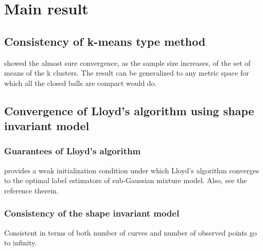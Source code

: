 

\section{Main result}




	\subsection{Consistency of k-means type method}
		\citet{Pollard1981a} showed the almost sure convergence, as the sample size increases, of the set of means of the k clusters. The result can be generalized to any metric space for which all the closed balls are compact would do.

	\subsection{Convergence of Lloyd's algorithm using shape invariant model}
		\subsubsection*{Guarantees of Lloyd's algorithm}
			\citet{Lu} provides a weak initialization condition under which Lloyd's algorithm converges to the optimal label estimators of sub-Gaussian mixture model.
			Also, see the reference therein.
		\subsubsection*{Consistency of the shape invariant model}

		Consistent in terms of both number of curves and number of observed points go to infinity.

